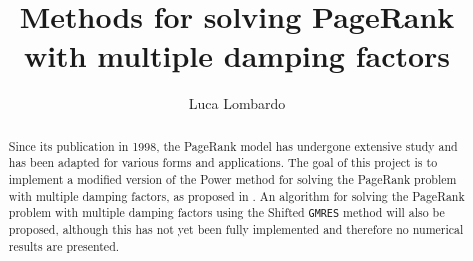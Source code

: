 \documentclass[11pt]{article}
\title{Methods for solving PageRank with multiple damping factors}
\author{Luca Lombardo}
\date{}
\begin{document}
\maketitle

\begin{abstract}
    \noindent Since its publication in 1998, the PageRank model has undergone extensive study and has been adapted for various forms and applications. The goal of this project is to implement a modified version of the Power method for solving the PageRank problem with multiple damping factors, as proposed in \cite{SHEN2022126799}. An algorithm for solving the PageRank problem with multiple damping factors using the Shifted \texttt{GMRES} method will also be proposed, although this has not yet been fully implemented and therefore no numerical results are presented.
\end{abstract}

\tableofcontents
\clearpage






\clearpage


\nocite{*}
\end{document}
